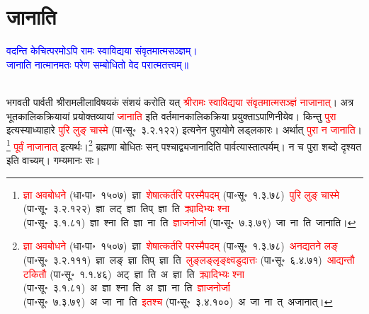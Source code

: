 \section[जानाति]{जानाति}
\centering\textcolor{blue}{वदन्ति केचित्परमोऽपि रामः स्वाविद्यया संवृतमात्मसञ्ज्ञम्।\nopagebreak\\
जानाति नात्मानमतः परेण सम्बोधितो वेद परात्मतत्त्वम्॥}\nopagebreak\\
\\
\fontsize{14}{21}\selectfont\begin{sloppypar}\justifying\noindent\hspace{10mm} भगवती पार्वती श्रीराम\-लीला\-विषयकं संशयं करोति यत् \textcolor{red}{श्रीरामः स्वाविद्यया संवृतमात्म\-सञ्ज्ञं नाजानात्}। अत्र भूत\-कालिक\-क्रियायां प्रयोक्तव्यायां \textcolor{red}{जानाति} इति वर्तमान\-कालिक\-क्रिया प्रयुक्ताऽपाणिनीयेव। किन्तु \textcolor{red}{पुरा} इत्यस्याध्याहारे \textcolor{red}{पुरि लुङ् चास्मे} (पा॰सू॰~३.२.१२२) इत्यनेन पुरा\-योगे लड्लकारः। अर्थात् \textcolor{red}{पुरा न जानाति}।\footnote{\textcolor{red}{ज्ञा अवबोधने} (धा॰पा॰~१५०७)~\arrow ज्ञा~\arrow \textcolor{red}{शेषात्कर्तरि परस्मैपदम्} (पा॰सू॰~१.३.७८)~\arrow \textcolor{red}{पुरि लुङ् चास्मे} (पा॰सू॰~३.२.१२२)~\arrow ज्ञा~लट्~\arrow ज्ञा~तिप्~\arrow ज्ञा~ति~\arrow \textcolor{red}{क्र्यादिभ्यः श्ना} (पा॰सू॰~३.१.८१)~\arrow ज्ञा~श्ना~ति~\arrow ज्ञा~ना~ति~\arrow \textcolor{red}{ज्ञाजनोर्जा} (पा॰सू॰~७.३.७९)~\arrow जा~ना~ति~\arrow जानाति।} \textcolor{red}{पूर्वं नाजानात्} इत्यर्थः।\footnote{\textcolor{red}{ज्ञा अवबोधने} (धा॰पा॰~१५०७)~\arrow ज्ञा~\arrow \textcolor{red}{शेषात्कर्तरि परस्मैपदम्} (पा॰सू॰~१.३.७८)~\arrow \textcolor{red}{अनद्यतने लङ्} (पा॰सू॰~३.२.१११)~\arrow ज्ञा~लङ्~\arrow ज्ञा~तिप्~\arrow ज्ञा~ति~\arrow \textcolor{red}{लुङ्लङ्लृङ्क्ष्वडुदात्तः} (पा॰सू॰~६.४.७१)~\arrow \textcolor{red}{आद्यन्तौ टकितौ} (पा॰सू॰~१.१.४६)~\arrow अट्~ज्ञा~ति~\arrow अ~ज्ञा~ति~\arrow \textcolor{red}{क्र्यादिभ्यः श्ना} (पा॰सू॰~३.१.८१)~\arrow अ~ज्ञा~श्ना~ति~\arrow अ~ज्ञा~ना~ति~\arrow \textcolor{red}{ज्ञाजनोर्जा} (पा॰सू॰~७.३.७९)~\arrow अ~जा~ना~ति~\arrow \textcolor{red}{इतश्च} (पा॰सू॰~३.४.१००)~\arrow अ~जा~ना~त्~\arrow अजानात्।} ब्रह्मणा बोधितः सन् पश्चाद्व्यजानादिति पार्वत्यास्तात्पर्यम्। न च पुरा शब्दो दृश्यत इति वाच्यम्। गम्यमानः सः।\end{sloppypar}
